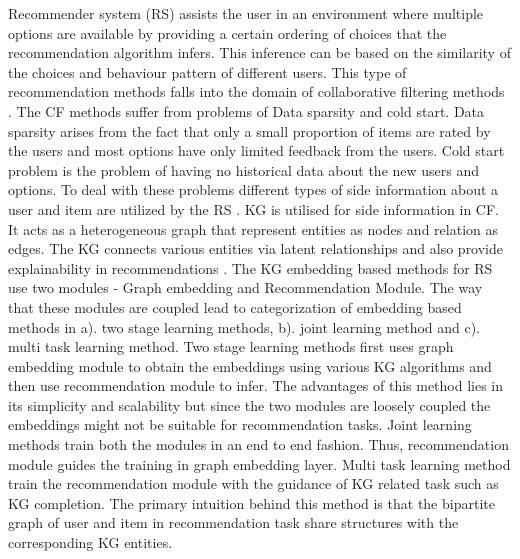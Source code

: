 Recommender system (RS) assists the user in an environment where multiple options are available by providing a certain ordering of choices that the recommendation algorithm infers. This inference can be based on the similarity of the choices and behaviour pattern of different users. This type of recommendation methods falls into the domain of collaborative filtering methods . 
\noindent
The CF methods suffer from problems of Data sparsity and cold start. Data sparsity arises from the fact that only a small proportion of items are rated by the users and most options have only limited feedback from the users. Cold start problem is the problem of having no historical data about the new users and options. To deal with these problems different types of side information about a user and item are utilized by the RS .
\noindent
KG is utilised for side information in CF. It acts as a heterogeneous graph that represent entities as nodes and relation as edges. The KG connects various entities via latent relationships and also provide explainability in recommendations .
\noindent
The KG embedding based methods for RS use two modules - Graph embedding and Recommendation Module. The way that these modules are coupled lead to categorization of embedding based methods in a). two stage learning methods, b). joint learning method and c). multi task learning method. 
\noindent
Two stage learning methods first uses graph embedding module to obtain the embeddings using various KG algorithms and then use recommendation module to infer. The advantages of this method lies in its simplicity and scalability but since the two modules are loosely coupled the embeddings might not be suitable for recommendation tasks.
\noindent
Joint learning methods train both the modules in an end to end fashion. Thus, recommendation module guides the training in graph embedding layer. 
\noindent
Multi task learning method train the recommendation module with the guidance of KG related task such as KG completion. The primary intuition behind this method is that the bipartite graph of user and item in recommendation task share structures with the corresponding KG entities.

